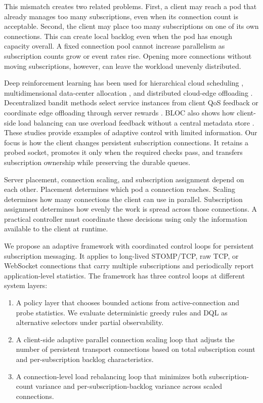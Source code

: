 \documentclass[manuscript,nonacm]{acmart}
\begin{document}
This mismatch creates two related problems. First, a client may reach a pod that already manages too many subscriptions, even when its connection count is acceptable. Second, the client may place too many subscriptions on one of its own connections. This can create local backlog even when the pod has enough capacity overall. A fixed connection pool cannot increase parallelism as subscription counts grow or event rates rise. Opening more connections without moving subscriptions, however, can leave the workload unevenly distributed.

Deep reinforcement learning has been used for hierarchical cloud scheduling \cite{Zhou2022DRLSelector}, multidimensional data-center allocation \cite{Wei2023TNSM}, and distributed cloud-edge offloading \cite{Nieto2024DRLOffloading}. Decentralized bandit methods select service instances from client QoS feedback \cite{Cilic2025} or coordinate edge offloading through server rewards \cite{Yahya2024}. BLOC also shows how client-side load balancing can use overload feedback without a central metadata store \cite{Bhattacharya2024}. These studies provide examples of adaptive control with limited information. Our focus is how the client changes persistent subscription connections. It retains a probed socket, promotes it only when the required checks pass, and transfers subscription ownership while preserving the durable queues.

Server placement, connection scaling, and subscription assignment depend on each other. Placement determines which pod a connection reaches. Scaling determines how many connections the client can use in parallel. Subscription assignment determines how evenly the work is spread across those connections. A practical controller must coordinate these decisions using only the information available to the client at runtime.

We propose an adaptive framework with coordinated control loops for persistent subscription messaging. It applies to long-lived STOMP/TCP, raw TCP, or WebSocket connections that carry multiple subscriptions and periodically report application-level statistics. The framework has three control loops at different system layers:

\begin{enumerate}
	\item A policy layer that chooses bounded actions from active-connection and probe statistics. We evaluate deterministic greedy rules and DQL as alternative selectors under partial observability.
	
	\item A client-side adaptive parallel connection scaling loop that adjusts the number of persistent transport connections based on total subscription count and per-subscription backlog characteristics.
	
	\item A connection-level load rebalancing loop that minimizes both subscription-count variance and per-subscription-backlog variance across scaled connections.
\end{enumerate}
\end{document}
